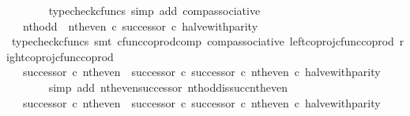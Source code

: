 \begin{isabellebody}
\ \ \ \ \ \ \isamarkupfalse%
\ {\isacharparenleft}{\kern0pt}typecheck{\isacharunderscore}{\kern0pt}cfuncs{\isacharcomma}{\kern0pt}\ simp\ add{\isacharcolon}{\kern0pt}\ comp{\isacharunderscore}{\kern0pt}associative{}{\isacharparenright}{\kern0pt}\isanewline
\ \ \ \ \isamarkupfalse%
\ \isamarkupfalse%
\ {\isachardoublequoteopen}{\isachardot}{\kern0pt}{\isachardot}{\kern0pt}{\isachardot}{\kern0pt}\ {\isacharequal}{\kern0pt}\ nth{\isacharunderscore}{\kern0pt}odd\ {\isasymamalg}\ {\isacharparenleft}{\kern0pt}nth{\isacharunderscore}{\kern0pt}even\ {\isasymcirc}\isactrlsub c\ successor{\isacharparenright}{\kern0pt}\ {\isasymcirc}\isactrlsub c\ halve{\isacharunderscore}{\kern0pt}with{\isacharunderscore}{\kern0pt}parity{\isachardoublequoteclose}\isanewline
\ \ \ \ \ \ \isamarkupfalse%
\ {\isacharparenleft}{\kern0pt}typecheck{\isacharunderscore}{\kern0pt}cfuncs{\isacharcomma}{\kern0pt}\ smt\ cfunc{\isacharunderscore}{\kern0pt}coprod{\isacharunderscore}{\kern0pt}comp\ comp{\isacharunderscore}{\kern0pt}associative{}\ left{\isacharunderscore}{\kern0pt}coproj{\isacharunderscore}{\kern0pt}cfunc{\isacharunderscore}{\kern0pt}coprod\ right{\isacharunderscore}{\kern0pt}coproj{\isacharunderscore}{\kern0pt}cfunc{\isacharunderscore}{\kern0pt}coprod{\isacharparenright}{\kern0pt}\isanewline
\ \ \ \ \isamarkupfalse%
\ \isamarkupfalse%
\ {\isachardoublequoteopen}{\isachardot}{\kern0pt}{\isachardot}{\kern0pt}{\isachardot}{\kern0pt}\ {\isacharequal}{\kern0pt}\ {\isacharparenleft}{\kern0pt}successor\ {\isasymcirc}\isactrlsub c\ nth{\isacharunderscore}{\kern0pt}even{\isacharparenright}{\kern0pt}\ {\isasymamalg}\ {\isacharparenleft}{\kern0pt}{\isacharparenleft}{\kern0pt}successor\ {\isasymcirc}\isactrlsub c\ successor{\isacharparenright}{\kern0pt}\ {\isasymcirc}\isactrlsub c\ nth{\isacharunderscore}{\kern0pt}even{\isacharparenright}{\kern0pt}\ {\isasymcirc}\isactrlsub c\ halve{\isacharunderscore}{\kern0pt}with{\isacharunderscore}{\kern0pt}parity{\isachardoublequoteclose}\isanewline
\ \ \ \ \ \ \isamarkupfalse%
\ {\isacharparenleft}{\kern0pt}simp\ add{\isacharcolon}{\kern0pt}\ nth{\isacharunderscore}{\kern0pt}even{\isacharunderscore}{\kern0pt}successor\ nth{\isacharunderscore}{\kern0pt}odd{\isacharunderscore}{\kern0pt}is{\isacharunderscore}{\kern0pt}succ{\isacharunderscore}{\kern0pt}nth{\isacharunderscore}{\kern0pt}even{\isacharparenright}{\kern0pt}\isanewline
\ \ \ \ \isamarkupfalse%
\ \isamarkupfalse%
\ {\isachardoublequoteopen}{\isachardot}{\kern0pt}{\isachardot}{\kern0pt}{\isachardot}{\kern0pt}\ {\isacharequal}{\kern0pt}\ {\isacharparenleft}{\kern0pt}successor\ {\isasymcirc}\isactrlsub c\ nth{\isacharunderscore}{\kern0pt}even{\isacharparenright}{\kern0pt}\ {\isasymamalg}\ {\isacharparenleft}{\kern0pt}successor\ {\isasymcirc}\isactrlsub c\ successor\ {\isasymcirc}\isactrlsub c\ nth{\isacharunderscore}{\kern0pt}even{\isacharparenright}{\kern0pt}\ {\isasymcirc}\isactrlsub c\ halve{\isacharunderscore}{\kern0pt}with{\isacharunderscore}{\kern0pt}parity{\isachardoublequoteclose}\isanewline

\end{isabellebody}
